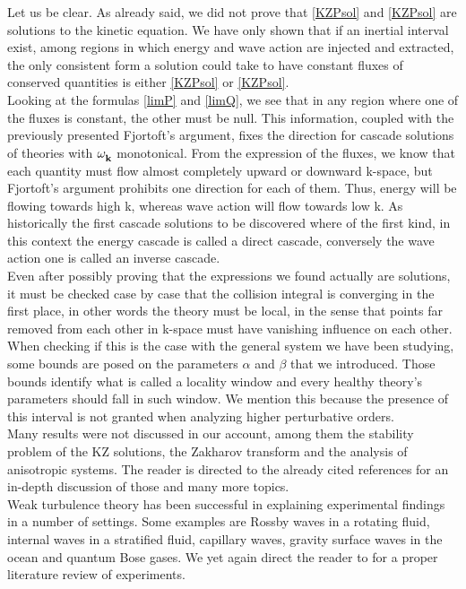 Let us be clear. As already said, we did not prove that \eqref{KZPsol} and \eqref{KZPsol} are solutions to the kinetic equation. We have only shown that if 
an inertial interval exist, among regions in which energy and wave action are injected and extracted, the only consistent form a solution could take to have constant fluxes of conserved quantities is either \eqref{KZPsol} or \eqref{KZPsol}. \\
Looking at the formulas \eqref{limP} and \eqref{limQ}, we see that in any region where one of the fluxes is constant, the other must be null. This information, coupled 
with the previously presented Fjortoft's argument, fixes the direction for cascade solutions of theories with $\omega^{}_{\mathbf{k}}$ monotonical. From the expression of the fluxes, 
we know that each quantity must flow almost completely upward or downward k-space, but Fjortoft's argument prohibits one direction for each of them. Thus, energy
will be flowing towards high k, whereas wave action will flow towards low k. As historically the first cascade solutions to be discovered where of the first kind, 
in this context the energy cascade is called a direct cascade, conversely the wave action one is called an inverse cascade. \\

Even after possibly proving that the expressions we found actually are solutions, it must be checked case by case that the collision integral is converging in the first place,  in other words the theory must be local, in the sense that points far removed from each other in k-space must have vanishing influence on each other. \\
When checking if this is the case with the general system we have been studying, some bounds are posed on the parameters $\alpha$ and $\beta$ that we introduced.
Those bounds identify what is called a locality window and every healthy theory's parameters should fall in such window. We mention this because 
the presence of this interval is not granted when analyzing higher perturbative orders.\\ 

Many results were not discussed in our account, among them the stability problem of the KZ solutions, the Zakharov transform and the analysis of anisotropic systems. The reader is directed to the 
already cited references for an in-depth discussion of those and many more topics.\\

Weak turbulence theory has been successful in explaining experimental findings in a number of settings. Some examples are Rossby waves in a rotating fluid, internal waves 
in a stratified fluid, capillary waves, gravity surface waves in the ocean and quantum Bose gases. We yet again direct the reader to \cite{Nazarenko2011} for a proper literature review of experiments.\\

